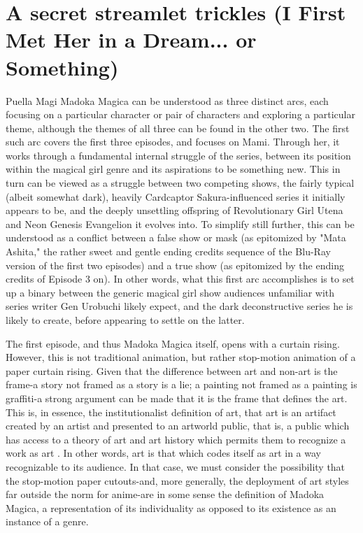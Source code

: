 \chapter{A secret streamlet trickles (I First Met Her in a Dream... or Something)}
Puella Magi Madoka Magica can be understood as three distinct arcs, each focusing on a particular character or pair of characters and exploring a particular theme, although the themes of all three can be found in the other two. The first such arc covers the first three episodes, and focuses on Mami. Through her, it works through a fundamental internal struggle of the series, between its position within the magical girl genre and its aspirations to be something new. This in turn can be viewed as a struggle between two competing shows, the fairly typical (albeit somewhat dark), heavily Cardcaptor Sakura-influenced series it initially appears to be, and the deeply unsettling offspring of Revolutionary Girl Utena and Neon Genesis Evangelion it evolves into. To simplify still further, this can be understood as a conflict between a false show or mask (as epitomized by "Mata Ashita," the rather sweet and gentle ending credits sequence of the Blu-Ray version of the first two episodes) and a true show (as epitomized by the ending credits of Episode 3 on). In other words, what this first arc accomplishes is to set up a binary between the generic magical girl show audiences unfamiliar with series writer Gen Urobuchi likely expect, and the dark deconstructive series he is likely to create, before appearing to settle on the latter.

The first episode, and thus Madoka Magica itself, opens with a curtain rising. However, this is not traditional animation, but rather stop-motion animation of a paper curtain rising. Given that the difference between art and non-art is the frame-a story not framed as a story is a lie; a painting not framed as a painting is graffiti-a strong argument can be made that it is the frame that defines the art. This is, in essence, the institutionalist definition of art, that art is an artifact created by an artist and presented to an artworld public, that is, a public which has access to a theory of art and art history which permits them to recognize a work as art \cite{ref12}. In other words, art is that which codes itself as art in a way recognizable to its audience. In that case, we must consider the possibility that the stop-motion paper cutouts-and, more generally, the deployment of art styles far outside the norm for anime-are in some sense the definition of Madoka Magica, a representation of its individuality as opposed to its existence as an instance of a genre.

